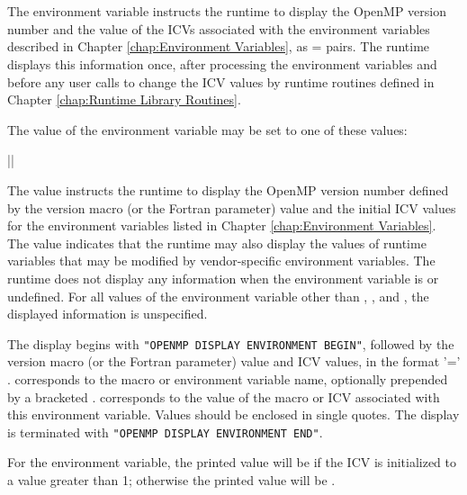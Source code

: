 \section{}
\label{sec:OMP_DISPLAY_ENV}
The  environment variable instructs the runtime to display the
OpenMP version number and the value of the ICVs associated with the environment
variables described in Chapter \ref{chap:Environment Variables},
as  =  pairs. The runtime displays this
information once, after processing the environment variables and before any user calls
to change the ICV values by runtime routines defined in Chapter \ref{chap:Runtime Library Routines}.

The value of the  environment variable may be set to one of these
values:

{||}

The  value instructs the runtime to display the OpenMP version number defined by
the  version macro (or the  Fortran parameter) value and
the initial ICV values for the environment variables listed in
Chapter \ref{chap:Environment Variables}. The 
value indicates that the runtime may also display the values
of runtime variables that may be modified by vendor-specific
environment variables. The runtime does not display any information
when the  environment variable is
 or undefined. For all values of the environment
variable other than , , and ,
the displayed information is unspecified.

The display begins with \texttt{"OPENMP DISPLAY ENVIRONMENT BEGIN"}, followed by
the  version macro (or the  Fortran parameter) value and
ICV values, in the format  '=' .  corresponds to the macro or
environment variable name, optionally prepended by a bracketed . 
corresponds to the value of the macro or ICV associated with this environment variable.
Values should be enclosed in single quotes. The display is terminated with
\texttt{"OPENMP DISPLAY ENVIRONMENT END"}.

For the  environment variable, the printed value will
be  if the  ICV is initialized to a
value greater than 1; otherwise the printed value will be .

